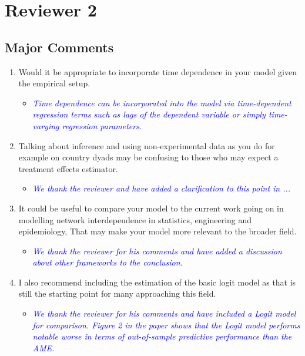 \section{Reviewer 2}

\subsection{Major Comments}

\begin{enumerate}
	\item Would it be appropriate to incorporate time dependence in your model given the empirical setup.
	\begin{itemize}
		\item \textcolor{blue}{ \emph{
		Time dependence can be incorporated into the model via time-dependent regression terms such as lags of the dependent variable or simply time-varying regression parameters.
		}}
	\end{itemize}
	\item Talking about inference and using non-experimental data as you do for example on country dyads may be confusing to those who may expect a treatment effects estimator.
	\begin{itemize}
		\item \textcolor{blue}{ \emph{
		We thank the reviewer and have added a clarification to this point in ...
		}}
	\end{itemize}	
	\item It could be useful to compare your model to the current work going on in modelling network interdependence in statistics, engineering and epidemiology, That may make your model more relevant to the broader field.
	\begin{itemize}
		\item \textcolor{blue}{ \emph{
		We thank the reviewer for his comments and have added a discussion about other frameworks to the conclusion.
		}}
	\end{itemize}	
	\item I also recommend including the estimation of the basic logit model as that is still the starting point for many approaching this field.
	\begin{itemize}
		\item \textcolor{blue}{ \emph{
		We thank the reviewer for his comments and have included a Logit model for comparison. Figure 2 in the paper shows that the Logit model performs notable worse in terms of out-of-sample predictive performance than the AME.
		}}
	\end{itemize}	
\end{enumerate}
